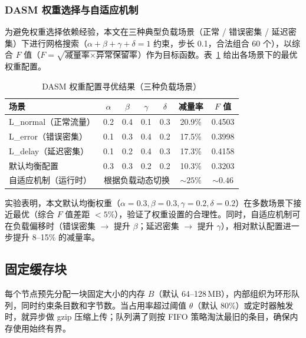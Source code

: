 \subsubsection{DASM 权重选择与自适应机制}
\label{sec:weight-selection}

为避免权重选择依赖经验，本文在三种典型负载场景（正常 / 错误密集 / 延迟密集）下进行网格搜索（$\alpha+\beta+\gamma+\delta=1$ 约束，步长 0.1，合法组合 60 个），以综合 $F$ 值（$F=\sqrt{\text{减量率} \times \text{异常保留率}}$）作为目标函数。表~\ref{tab:weight-search} 给出各场景下的最优权重配置。

\begin{table}[H]
  \centering\small
  \caption{DASM 权重配置寻优结果（三种负载场景）}\label{tab:weight-search}
  \begin{tabular}{lcccccc}
    \toprule
    场景 & $\alpha$ & $\beta$ & $\gamma$ & $\delta$ & 减量率 & $F$ 值 \\
    \midrule
    L\_normal（正常流量） & 0.2 & 0.4 & 0.1 & 0.3 & 20.9\% & 0.4503 \\
    L\_error（错误密集）  & 0.1 & 0.3 & 0.4 & 0.2 & 17.5\% & 0.3998 \\
    L\_delay（延迟密集）  & 0.1 & 0.2 & 0.4 & 0.3 & 17.3\% & 0.4158 \\
    \midrule
    默认均衡配置          & 0.3 & 0.3 & 0.2 & 0.2 & 10.3\% & 0.3203 \\
    自适应机制（运行时）  & \multicolumn{4}{c}{根据负载动态切换} & $\sim 25\%$ & $\sim 0.46$ \\
    \bottomrule
  \end{tabular}
\end{table}

实验表明，本文默认均衡权重（$\alpha=0.3, \beta=0.3, \gamma=0.2, \delta=0.2$）在多数场景下接近最优（综合 $F$ 值差距 $<5\%$），验证了权重设置的合理性。同时，自适应机制可在负载偏移时（错误密集 $\to$ 提升 $\beta$；延迟密集 $\to$ 提升 $\gamma$），相对默认配置进一步提升 8--15\% 的减量率。


\subsection{固定缓存块}
每个节点预先分配一块固定大小的内存 $B$（默认 64--128\,MB），内部组织为环形队列，同时约束条目数和字节数。当占用率超过阈值 $\theta$（默认 80\%）或定时器触发时，就异步做 gzip 压缩上传；队列满了则按 FIFO 策略淘汰最旧的条目，确保内存使用始终有界。

